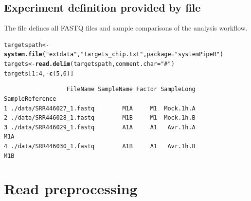 \documentclass{article}\usepackage[]{graphicx}\usepackage[]{color}
\makeatletter
\newcommand{\hlnum}[1]{\textcolor[rgb]{0.686,0.059,0.569}{#1}}%
\newcommand{\hlstr}[1]{\textcolor[rgb]{0.192,0.494,0.8}{#1}}%
\newcommand{\hlopt}[1]{\textcolor[rgb]{0,0,0}{#1}}%
\newcommand{\hlstd}[1]{\textcolor[rgb]{0.345,0.345,0.345}{#1}}%
\newcommand{\hlkwb}[1]{\textcolor[rgb]{0.69,0.353,0.396}{#1}}%
\newcommand{\hlkwc}[1]{\textcolor[rgb]{0.333,0.667,0.333}{#1}}%
\newcommand{\hlkwd}[1]{\textcolor[rgb]{0.737,0.353,0.396}{\textbf{#1}}}%
\newenvironment{kframe}{%
 \def\at@end@of@kframe{}%
 \ifinner\ifhmode%
  \def\at@end@of@kframe{\end{minipage}}%
  \begin{minipage}{\columnwidth}%
 \fi\fi%
 \def\FrameCommand##1{\hskip\@totalleftmargin \hskip-\fboxsep
 \colorbox{shadecolor}{##1}\hskip-\fboxsep
     \hskip-\linewidth \hskip-\@totalleftmargin \hskip\columnwidth}%
 \MakeFramed {\advance\hsize-\width
   \@totalleftmargin\z@ \linewidth\hsize
   \@setminipage}}%
 {\par\unskip\endMakeFramed%
 \at@end@of@kframe}
\newenvironment{knitrout}{}{} %
\makeatother
\begin{document}
\subsection{Experiment definition provided by  file}
The \href{run:targets_chip.txt}{} file defines all FASTQ files and sample comparisons of the analysis workflow. 
\begin{knitrout}
\color{fgcolor}\begin{kframe}
\begin{alltt}
\hlstd{targetspath} \hlkwb{<-} \hlkwd{system.file}\hlstd{(}\hlstr{"extdata"}\hlstd{,} \hlstr{"targets_chip.txt"}\hlstd{,} \hlkwc{package}\hlstd{=}\hlstr{"systemPipeR"}\hlstd{)}
\hlstd{targets} \hlkwb{<-} \hlkwd{read.delim}\hlstd{(targetspath,} \hlkwc{comment.char} \hlstd{=} \hlstr{"#"}\hlstd{)}
\hlstd{targets[}\hlnum{1}\hlopt{:}\hlnum{4}\hlstd{,}\hlopt{-}\hlkwd{c}\hlstd{(}\hlnum{5}\hlstd{,}\hlnum{6}\hlstd{)]}
\end{alltt}
\begin{verbatim}
                  FileName SampleName Factor SampleLong SampleReference
1 ./data/SRR446027_1.fastq        M1A     M1  Mock.1h.A                
2 ./data/SRR446028_1.fastq        M1B     M1  Mock.1h.B                
3 ./data/SRR446029_1.fastq        A1A     A1   Avr.1h.A             M1A
4 ./data/SRR446030_1.fastq        A1B     A1   Avr.1h.B             M1B
\end{verbatim}
\end{kframe}
\end{knitrout}

\section{Read preprocessing}
\end{document}
